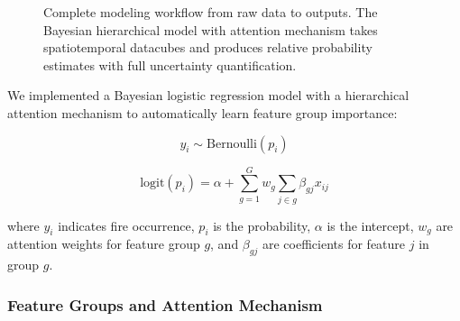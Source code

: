 \documentclass[11pt,a4paper]{article}
\begin{document}
\begin{figure}[H]

\caption{Complete modeling workflow from raw data to outputs. The Bayesian hierarchical model with attention mechanism takes spatiotemporal datacubes and produces relative probability estimates with full uncertainty quantification.}
\label{fig:workflow_method}
\end{figure}

We implemented a Bayesian logistic regression model with a hierarchical attention mechanism to automatically learn feature group importance:

\begin{equation}
y_i \sim \text{Bernoulli}(p_i)
\end{equation}

\begin{equation}
\text{logit}(p_i) = \alpha + \sum_{g=1}^{G} w_g \sum_{j \in g} \beta_{gj} x_{ij}
\end{equation}

where $y_i$ indicates fire occurrence, $p_i$ is the probability, $\alpha$ is the intercept, $w_g$ are attention weights for feature group $g$, and $\beta_{gj}$ are coefficients for feature $j$ in group $g$.

\subsubsection{Feature Groups and Attention Mechanism}
\end{document}
